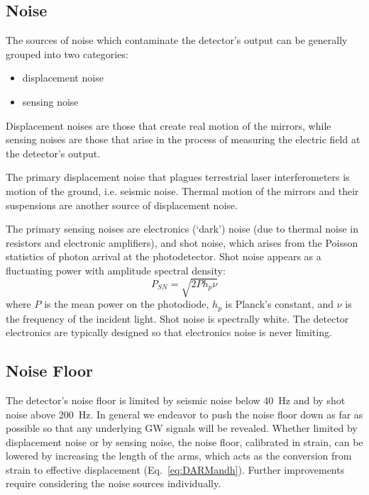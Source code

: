 \subsection{Noise}
The sources of noise which contaminate the detector's output can be 
generally grouped into two categories:
\begin{itemize}
\item displacement noise \vspace{-10 pt}
\item sensing noise
\end{itemize}
Displacement noises are those that create real motion of the mirrors,
while
sensing noises are those that arise in the process of measuring the
electric field at the detector's output.

The primary displacement noise that plagues terrestrial laser
interferometers is motion of the ground, i.e. seismic noise.  Thermal
motion of the mirrors and their suspensions are another source of
displacement noise. 



The primary sensing noises are electronics (`dark') noise (due to
thermal noise in resistors and electronic amplifiers), and shot
noise, which arises from the Poisson statistics of photon arrival
at the photodetector. Shot noise appears as a
fluctuating power with amplitude spectral density:
\begin{equation}
P_{SN} = \sqrt{2 P h_p \nu}
\label{eq:shotnoise}
\end{equation}
where $P$ is the mean power on the photodiode, $h_p$ is Planck's
constant, and $\nu$ is the frequency of the incident light. Shot noise
is spectrally white.  The detector electronics are typically designed
so that electronics noise is never limiting.

\subsection{Noise Floor}
The detector's noise floor is limited by seismic noise below 40~Hz and
by shot noise above 200~Hz.   In general we endeavor to push the noise floor down as far as possible
so that any underlying GW signals will be revealed.  Whether
limited by displacement noise or by sensing noise, the noise floor,
calibrated in strain, can be lowered by increasing the length of the
arms, which acts as the conversion from strain to effective displacement
(Eq.~\ref{eq:DARMandh}).
Further improvements require considering the noise
sources individually.

